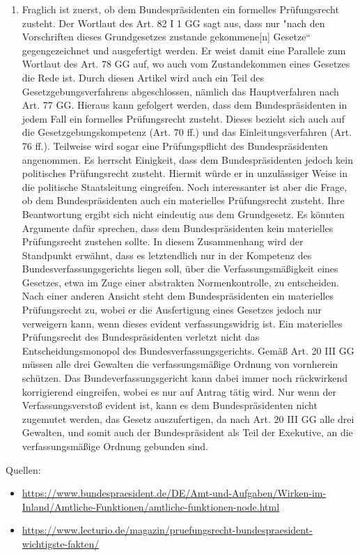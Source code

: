 \documentclass{article}
\begin{document}
\begin{enumerate}[label=(\alph*)]
		\item Fraglich ist zuerst, ob dem Bundespräsidenten ein formelles Prüfungsrecht zusteht. Der Wortlaut des Art. 82 I 1 GG sagt aus, dass nur "nach den Vorschriften dieses Grundgesetzes zustande gekommene[n] Gesetze“ gegengezeichnet und ausgefertigt werden. Er weist damit eine Parallele zum Wortlaut des Art. 78 GG auf, wo auch vom Zustandekommen eines Gesetzes die Rede ist. Durch diesen Artikel wird auch ein Teil des Gesetzgebungsverfahrens abgeschlossen, nämlich das Hauptverfahren nach Art. 77 GG. Hieraus kann gefolgert werden, dass dem Bundespräsidenten in jedem Fall ein formelles Prüfungsrecht zusteht. Dieses bezieht sich auch auf die Gesetzgebungskompetenz (Art. 70 ff.) und das Einleitungsverfahren (Art. 76 ff.). Teilweise wird sogar eine Prüfungspflicht des Bundespräsidenten angenommen. Es herrscht Einigkeit, dass dem Bundespräsidenten jedoch kein politisches Prüfungsrecht zusteht. Hiermit würde er in unzulässiger Weise in die politische Staatsleitung eingreifen. Noch interessanter ist aber die Frage, ob dem Bundespräsidenten auch ein materielles Prüfungsrecht zusteht. Ihre Beantwortung ergibt sich nicht eindeutig aus dem Grundgesetz. Es könnten Argumente dafür sprechen, dass dem Bundespräsidenten kein materielles Prüfungsrecht zustehen sollte. In diesem Zusammenhang wird der Standpunkt erwähnt, dass es letztendlich nur in der Kompetenz des Bundesverfassungsgerichts liegen soll, über die Verfassungsmäßigkeit eines Gesetzes, etwa im Zuge einer abstrakten Normenkontrolle, zu entscheiden. Nach einer anderen Ansicht steht dem Bundespräsidenten ein materielles Prüfungsrecht zu, wobei er die Ausfertigung eines Gesetzes jedoch nur verweigern kann, wenn dieses evident verfassungswidrig ist. Ein materielles Prüfungsrecht des Bundespräsidenten verletzt nicht das Entscheidungsmonopol des Bundesverfassungsgerichts. Gemäß Art. 20 III GG müssen alle drei Gewalten die verfassungsmäßige Ordnung von vornherein schützen. Das Bundeverfassungsgericht kann dabei immer noch rückwirkend korrigierend eingreifen, wobei es nur auf Antrag tätig wird. Nur wenn der Verfassungsverstoß evident ist, kann es dem Bundespräsidenten nicht zugemutet werden, das Gesetz auszufertigen, da nach Art. 20 III GG alle drei Gewalten, und somit auch der Bundespräsident als Teil der Exekutive, an die verfassungsmäßige Ordnung gebunden sind.
	\end{enumerate}

	Quellen:
	\begin{itemize}
		\item \url{https://www.bundespraesident.de/DE/Amt-und-Aufgaben/Wirken-im-Inland/Amtliche-Funktionen/amtliche-funktionen-node.html}
		\item \url{https://www.lecturio.de/magazin/pruefungsrecht-bundespraesident-wichtigste-fakten/}
	\end{itemize}
\end{document}

